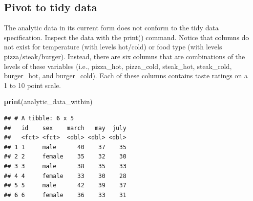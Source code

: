 \documentclass[
]{krantz}
\makeatletter
\newenvironment{Shaded}{\begin{snugshade}}{\end{snugshade}}
\newcommand{\CommentTok}[1]{\textcolor[rgb]{0.37,0.37,0.37}{\textit{#1}}}
\newcommand{\DataTypeTok}[1]{\textcolor[rgb]{0.27,0.27,0.27}{#1}}
\newcommand{\DecValTok}[1]{\textcolor[rgb]{0.06,0.06,0.06}{#1}}
\newcommand{\KeywordTok}[1]{\textcolor[rgb]{0.27,0.27,0.27}{\textbf{#1}}}
\newcommand{\NormalTok}[1]{#1}
\newcommand{\OperatorTok}[1]{\textcolor[rgb]{0.43,0.43,0.43}{\textbf{#1}}}
\newcommand{\OtherTok}[1]{\textcolor[rgb]{0.37,0.37,0.37}{#1}}
\newcommand{\StringTok}[1]{\textcolor[rgb]{0.5,0.5,0.5}{#1}}
\newenvironment{kframe}{%
\medskip{}
\setlength{\fboxsep}{.8em}
 \def\at@end@of@kframe{}%
 \ifinner\ifhmode%
  \def\at@end@of@kframe{\end{minipage}}%
  \begin{minipage}{\columnwidth}%
 \fi\fi%
 \def\FrameCommand##1{\hskip\@totalleftmargin \hskip-\fboxsep
 \colorbox{shadecolor}{##1}\hskip-\fboxsep
     \hskip-\linewidth \hskip-\@totalleftmargin \hskip\columnwidth}%
 \MakeFramed {\advance\hsize-\width
   \@totalleftmargin\z@ \linewidth\hsize
   \@setminipage}}%
 {\par\unskip\endMakeFramed%
 \at@end@of@kframe}
\renewenvironment{Shaded}{\begin{kframe}}{\end{kframe}}
\makeatother
\begin{document}
\begin{Shaded}
\end{Shaded}

\hypertarget{pivot-to-tidy-data-1}{%
\subsection{Pivot to tidy data}\label{pivot-to-tidy-data-1}}

The analytic data in its current form does not conform to the tidy data specification. Inspect the data with the print() command. Notice that columns do not exist for temperature (with levels hot/cold) or food type (with levels pizza/steak/burger). Instead, there are six columns that are combinations of the levels of these variables (i.e., pizza\_hot, pizza\_cold, steak\_hot, steak\_cold, burger\_hot, and burger\_cold). Each of these columns contains taste ratings on a 1 to 10 point scale.

\begin{Shaded}
\begin{Highlighting}[]
\KeywordTok{print}\NormalTok{(analytic_data_within)}
\end{Highlighting}
\end{Shaded}

\begin{verbatim}
## # A tibble: 6 x 5
##   id    sex    march   may  july
##   <fct> <fct>  <dbl> <dbl> <dbl>
## 1 1     male      40    37    35
## 2 2     female    35    32    30
## 3 3     male      38    35    33
## 4 4     female    33    30    28
## 5 5     male      42    39    37
## 6 6     female    36    33    31
\end{verbatim}
\end{document}
